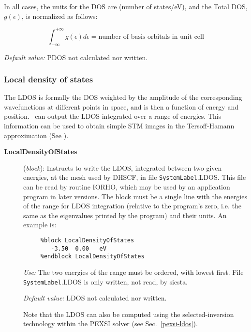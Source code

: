 \begin{description}
In all cases, the units for the DOS are (number of states/eV), and the
Total DOS, $g \left(\epsilon\right)$, is normalized as follows:

\begin{equation}
  \int_{-\infty}^{+\infty} g \left(\epsilon\right) d\epsilon =
  \text{number of basis orbitals in unit cell}
\end{equation}


\textit{Default value:} PDOS not calculated nor written.
\end{description}


\subsubsection{Local density of states}

The LDOS is formally the DOS weighted by the amplitude of the
corresponding wavefunctions at different points in space, and is then
a function of energy and position. \siesta\ can output the LDOS
integrated over a range of energies.  This information can be used to
obtain simple STM images in the Tersoff-Hamann approximation (See
).

\begin{description}
\item[\textbf{LocalDensityOfStates}] (\textit{block}):
Instructs to write the LDOS, integrated between two given energies,
at the mesh used by DHSCF,
in file \texttt{SystemLabel}.LDOS. This file can be read by routine IORHO,
which may be used by an application program in later versions.
The block must be a single line with the energies of the range for
LDOS integration
(relative to the program's zero, i.e. the same as the eigenvalues
printed by the program) and their units.
An example is:

\begin{verbatim}
     %block LocalDensityOfStates
        -3.50  0.00   eV
     %endblock LocalDensityOfStates
\end{verbatim}

\textit{Use:} The two energies of the range must be ordered,
with lowest first.
File \texttt{SystemLabel}.LDOS is only written, not read, by siesta.

\textit{Default value:} LDOS not calculated nor written.

Note that the LDOS can also be computed using the selected-inversion
technology within the PEXSI solver (see Sec.~\ref{pexsi-ldos}).
\end{description}


